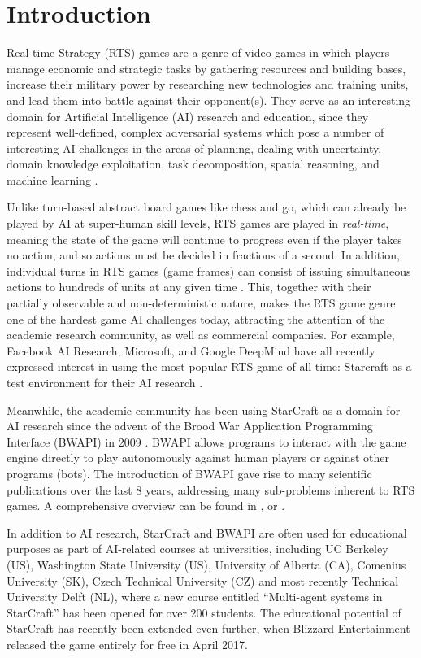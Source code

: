 \section{Introduction}\label{secIntro}

Real-time Strategy (RTS) games are a genre of video games in which players manage economic and strategic tasks by gathering resources and building bases, increase their military power by researching new technologies and training units, and lead them into battle against their opponent(s). They serve as an interesting domain for Artificial Intelligence (AI) research and education, since they represent well-defined, complex adversarial systems \cite{Buro2004} which pose a number of interesting AI challenges in the areas of planning, dealing with uncertainty, domain knowledge exploitation, task decomposition, spatial reasoning, and machine learning \cite{Survey2013}.

Unlike turn-based abstract board games like chess and go, which can already be played by AI at super-human skill levels, RTS games are played in \textit{real-time}, meaning the state of the game will continue to progress even if the player takes no action, and so actions must be decided in fractions of a second. In addition, individual turns in RTS games (game frames) can consist of issuing simultaneous actions to hundreds of units at any given time \cite{buro2012real}. This, together with their partially observable and non-deterministic nature, makes the RTS game genre one of the hardest game AI challenges today, attracting the attention of the academic research community, as well as commercial companies. For example, Facebook AI Research, Microsoft, and Google DeepMind have all recently expressed interest in using the most popular RTS game of all time: Starcraft as a test environment for their AI research \cite{gibney2016google}. 

Meanwhile, the academic community has been using StarCraft as a domain for AI research since the advent of the Brood War Application Programming Interface (BWAPI) in 2009 \cite{heinermann2013bwapi}. BWAPI allows programs to interact with the game engine directly to play autonomously against human players or against other programs (bots). The introduction of BWAPI gave rise to many scientific publications over the last 8 years, addressing many sub-problems inherent to RTS games. A comprehensive overview can be found in \cite{churchill2016starcraft}, \cite{ontanon2015rts} or \cite{Survey2013}.

In addition to AI research, StarCraft and BWAPI are often used for educational purposes as part of AI-related  courses at universities, including UC Berkeley (US), Washington State University (US), University of Alberta (CA), Comenius University (SK), Czech Technical University (CZ) and most recently Technical University Delft (NL), where a new course entitled ``Multi-agent systems in StarCraft'' has been opened for over 200 students. The educational potential of StarCraft has recently been extended even further, when Blizzard Entertainment released the game entirely for free in April 2017.

